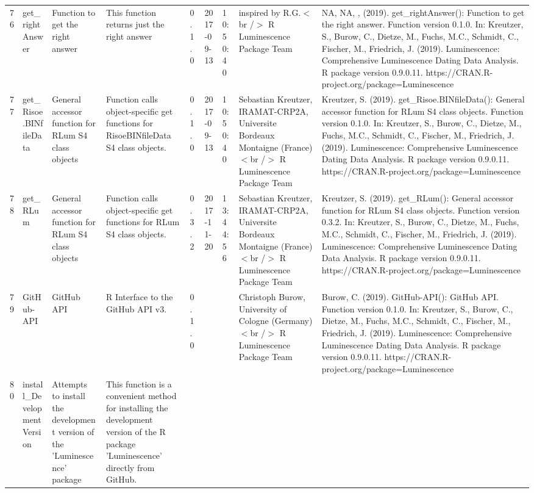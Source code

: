 \begin{table}[ht]
\begin{tabular}{rllllllll}
 \\ 
  76 & get\_rightAnswer & Function to get the right answer & This function returns just the right answer & 0.1.0 & 2017-09-13 & 10:50:40
 & inspired by R.G.$<$br /$>$  R Luminescence Package Team & NA, NA, ,  (2019). get\_rightAnswer(): Function to get the right answer. Function version 0.1.0. In: Kreutzer, S., Burow, C., Dietze, M., Fuchs, M.C., Schmidt, C., Fischer, M., Friedrich, J. (2019). Luminescence: Comprehensive Luminescence Dating Data Analysis. R package version 0.9.0.11. https://CRAN.R-project.org/package=Luminescence
 \\ 
  77 & get\_Risoe.BINfileData & General accessor function for RLum S4 class objects & Function calls object-specific get functions for RisoeBINfileData S4 class objects. & 0.1.0 & 2017-09-13 & 10:50:40
 & Sebastian Kreutzer, IRAMAT-CRP2A, Universite Bordeaux Montaigne (France)$<$br /$>$  R Luminescence Package Team & Kreutzer, S. (2019). get\_Risoe.BINfileData(): General accessor function for RLum S4 class objects. Function version 0.1.0. In: Kreutzer, S., Burow, C., Dietze, M., Fuchs, M.C., Schmidt, C., Fischer, M., Friedrich, J. (2019). Luminescence: Comprehensive Luminescence Dating Data Analysis. R package version 0.9.0.11. https://CRAN.R-project.org/package=Luminescence
 \\ 
  78 & get\_RLum & General accessor function for RLum S4 class objects & Function calls object-specific get functions for RLum S4 class objects. & 0.3.2 & 2017-11-20 & 13:44:56
 & Sebastian Kreutzer, IRAMAT-CRP2A, Universite Bordeaux Montaigne (France)$<$br /$>$  R Luminescence Package Team & Kreutzer, S. (2019). get\_RLum(): General accessor function for RLum S4 class objects. Function version 0.3.2. In: Kreutzer, S., Burow, C., Dietze, M., Fuchs, M.C., Schmidt, C., Fischer, M., Friedrich, J. (2019). Luminescence: Comprehensive Luminescence Dating Data Analysis. R package version 0.9.0.11. https://CRAN.R-project.org/package=Luminescence
 \\ 
  79 & GitHub-API & GitHub API & R Interface to the GitHub API v3. & 0.1.0
 &  &  & Christoph Burow, University of Cologne (Germany)$<$br /$>$  R Luminescence Package Team & Burow, C. (2019). GitHub-API(): GitHub API. Function version 0.1.0. In: Kreutzer, S., Burow, C., Dietze, M., Fuchs, M.C., Schmidt, C., Fischer, M., Friedrich, J. (2019). Luminescence: Comprehensive Luminescence Dating Data Analysis. R package version 0.9.0.11. https://CRAN.R-project.org/package=Luminescence
 \\ 
  80 & install\_DevelopmentVersion & Attempts to install the development version of the 'Luminescence' package & This function is a convenient method for installing the development version of the R package 'Luminescence' directly from GitHub. &  &  &  &  &  \\ 

\end{tabular}
\end{table}
